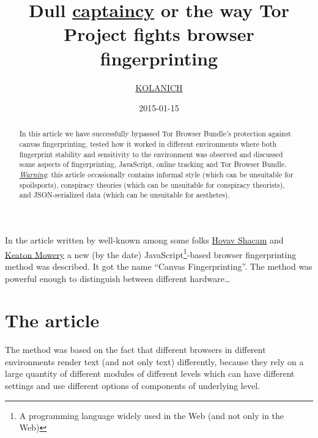 \documentclass[letterpaper,14pt]{article}
\begin{document}
\title{Dull \href{https://encyclopediadramatica.se/Captain_Obvious}{captaincy} or the way Tor Project fights browser fingerprinting}
\author{\href{https://github.com/KOLANICH}{KOLANICH}}
\date{2015-01-15}
\maketitle
\begin{abstract}\label{abstract}
In this article we have successfully bypassed Tor Browser Bundle's protection against canvas fingerprinting, tested how it worked in different environments where both fingerprint stability and sensitivity to the environment was observed and discussed some aspects of fingerprinting, JavaScript, online tracking and Tor Browser Bundle.\\

\emph{\href{https://xkcd.com/}{Warning}}: this article occasionally contains informal style (which can be unsuitable for spoilsports), conspiracy theories (which can be unsuitable for conspiracy theorists), and JSON-serialized data (which can be unsuitable for aesthetes).
\end{abstract}
\doclicenseThis
\newpage
\tableofcontents
\newpage

In the article \cite{MS12} written by well-known among some folks \href{https://cseweb.ucsd.edu/~hovav/papers.html}{Hovav Shacam} and \href{https://cseweb.ucsd.edu/~kmowery/}{Keaton Mowery} a new (by the date) JavaScript\footnote{A programming language widely used in the Web (and not only in the Web)}-based browser fingerprinting\cite{Eckersley2010} method was described. It got the name ``Canvas Fingerprinting''. The method was powerful enough to distinguish between different hardware\ldots{}

\section{The article}\label{the-article}

The method was based on the fact that different browsers in different environments render text (and not only text) differently, because they rely on a large quantity of different modules of different levels which can have different settings and use different options of components of underlying level.
\end{document}
